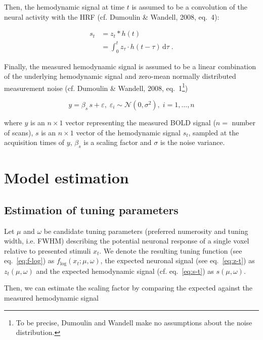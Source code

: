 \documentclass[a4paper,12pt]{article}
\begin{document}
Then, the hemodynamic signal at time $t$ is assumed to be a convolution of the neural activity with the HRF (cf. Dumoulin \& Wandell, 2008, eq.~4):

\begin{equation} \label{eq:s-t}
\begin{split}
s_t &= z_t \ast h(t) \\
&= \int_{0}^{t} z_\tau \cdot h(t-\tau) \, \mathrm{d}\tau \; .
\end{split}
\end{equation}

Finally, the measured hemodynamic signal is assumed to be a linear combination of the underlying hemodynamic signal and zero-mean normally distributed measurement noise (cf. Dumoulin \& Wandell, 2008, eq.~1\footnote{To be precise, Dumoulin and Wandell make no assumptions about the noise distribution.})

\begin{equation} \label{eq:y}
y = \beta_s \, s + \varepsilon, \; \varepsilon_i \sim \mathcal{N}(0, \sigma^2), \; i = 1,\ldots,n
\end{equation}

where $y$ is an $n \times 1$ vector representing the measured BOLD signal ($n =$ number of scans), $s$ is an $n \times 1$ vector of the hemodynamic signal $s_t$, sampled at the acquisition times of $y$, $\beta_s$ is a scaling factor and $\sigma$ is the noise variance.


\section{Model estimation} \label{sec:Est}

\subsection{Estimation of tuning parameters}

Let $\mu$ and $\omega$ be candidate tuning parameters (preferred numerosity and tuning width, i.e. FWHM) describing the potential neuronal response of a single voxel relative to presented stimuli $x_t$. We denote the resulting tuning function (see eq.~\ref{eq:f-log}) as $f_\mathrm{log}(x_t; \mu, \omega)$, the expected neuronal signal (see eq.~\ref{eq:z-t}) as $z_t(\mu,\omega)$ and the expected hemodynamic signal (cf. eq.~\ref{eq:s-t}) as $s(\mu,\omega)$.

Then, we can estimate the scaling factor by comparing the expected against the measured hemodynamic signal
\end{document}
